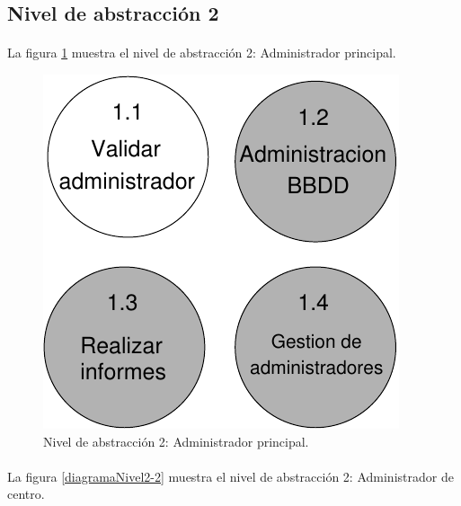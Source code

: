 \subsection{Nivel de abstracción 2}

  \paragraph{}La figura \ref{diagramaNivel2-1} muestra el nivel de abstracción
  2: Administrador principal.

        \begin{figure}[!ht]
            \begin{center}
            \includegraphics[]{08.Analisis_Funcional/8.2.DFDs/Niveles/Diagramas/nivel2-1.pdf}
            \caption{Nivel de abstracción 2: Administrador principal.}
            \label{diagramaNivel2-1}
            \end{center}
         \end{figure}

  \paragraph{}La figura \ref{diagramaNivel2-2} muestra el nivel de abstracción
  2: Administrador de centro.

